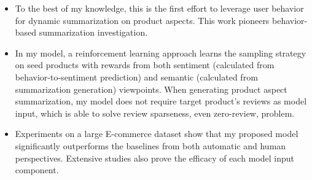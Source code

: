 \begin{itemize}
	\item To the best of my knowledge, this is the first effort to leverage user behavior for dynamic summarization on product aspects. This work pioneers behavior-based summarization investigation.  
	\item In my model, a reinforcement learning approach learns the sampling strategy on seed products with rewards from both sentiment (calculated from behavior-to-sentiment prediction) and semantic (calculated from summarization generation) viewpoints. When generating product aspect summarization, my model does not require target product's reviews as model input, which is able to solve review sparseness, even zero-review, problem.  
	\item  Experiments on a large E-commerce dataset show that my proposed model significantly outperforms the baselines from both automatic and human perspectives. Extensive studies also prove the efficacy of each model input component.   
	
\end{itemize}